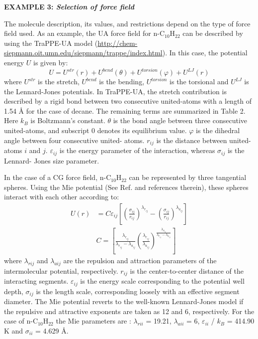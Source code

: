 \documentclass[9pt,bestpractices]{livecoms}
\begin{document}
\begin{mdframed}[linewidth=0pt,backgroundcolor=LiveCoMSLightBlue!8,fontcolor=LiveCoMSDarkBlue!80!black]
  \textbf{EXAMPLE 3: \textit{Selection of force field}}

The molecule description, its values, and restrictions depend on the type of
force field used. As an example, the UA force field for
n-C$_{10}$H$_{22}$ can be described by using the TraPPE-UA model (\url{http://chem-siepmann.oit.umn.edu/siepmann/trappe/index.html}).
In this case, the potential energy $U$ is given by:
\begin{equation}
U=U^{str}\left(r\right)+U^{bend}\left(\theta\right)+U^{torsion}\left(\varphi\right)+U^{LJ}\left(r\right)
\end{equation}
where $U^{str}$ is the stretch, $U^{bend}$ is the bending,
$U^{torsion}$ is the torsional and $U^{LJ}$ is the
Lennard-Jones potentials. In TraPPE-UA, the stretch contribution is described
by a rigid bond between two consecutive united-atoms with a length of 1.54
\AA{} for the case of decane. The remaining terms are summarized in Table 2.
Here $k_{B}$ is Boltzmann's constant. ${\theta}$ is the bond angle between
three consecutive united-atoms, and subscript 0 denotes its equilibrium value.
${\varphi}$ is the dihedral angle between four consecutive united- atoms.
$r_{ij}$ is the distance between united-atoms $i$ and
$j$. ${\varepsilon}_{ij}$ is the energy parameter of the interaction,
whereas ${\sigma}_{ij}$ is the Lennard- Jones size parameter. 

In the case of a CG force field, n-C$_{10}$H$_{22}$ can be represented by three
tangential spheres. Using the Mie potential (See Ref. \citep{muller2014} and
references therein), these spheres interact with each other according to:
\begin{equation}
\begin{aligned}
  U\left(r\right) &= C\varepsilon_{ij}\left[\left(\frac{\sigma_{ij}}{r_{ij}}\right)^{\lambda_{r_{ij}}}-\left(\frac{\sigma_{ij}}{r_{ij}}\right)^{\lambda_{a_{ij}}}\right] \\
  & C = \left[\frac{\lambda_{r_{ij}}}{\lambda_{r_{ij}}-\lambda_{a_{ij}}}\left(\frac{\lambda_{r_{ij}}}{\lambda_{a_{ij}}}\right)^{\frac{\lambda_{a_{ij}}}{\lambda_{r_{ij}}-\lambda_{a_{ij}}}}\right]
\end{aligned}
\end{equation}
\ignorespacesafterend
where {${\lambda}$}$_{rij}$ and {${\lambda}$}$_{aij}$ are the repulsion and
attraction parameters of the intermolecular potential, respectively.
$r_{ij}$ is the center-to-center distance of the interacting segments.
${\varepsilon}_{ij}$ is the energy scale corresponding to the potential well
depth, ${\sigma}_{ij}$ is the length scale, corresponding loosely with an
effective segment diameter. The Mie potential reverts to the well-known
Lennard-Jones model if the repulsive and attractive exponents are taken as 12
and 6, respectively. For the case of n-C$_{10}$H$_{22}$ the Mie parameters are
\citep{mejia2014a}:
{${\lambda}$}$_{rii}$ = 19.21, {${\lambda}$}$_{aii}$ = 6,
${\varepsilon}_{ii}$ / $k_{B}$ = 414.90 K and ${\sigma}_{ii}$
= 4.629 \AA{}.


\end{mdframed}
\end{document}

